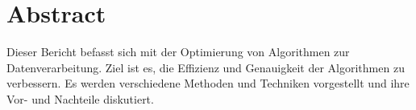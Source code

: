 \section*{Abstract}
	Dieser Bericht befasst sich mit der Optimierung von Algorithmen zur Datenverarbeitung. Ziel ist es, die Effizienz und Genauigkeit der Algorithmen zu verbessern. Es werden verschiedene Methoden und Techniken vorgestellt und ihre Vor- und Nachteile diskutiert.

